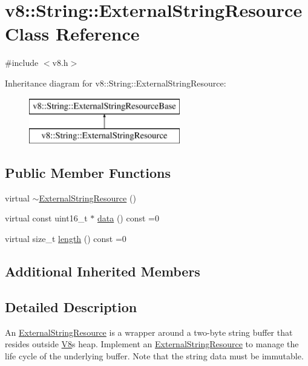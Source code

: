 \hypertarget{classv8_1_1_string_1_1_external_string_resource}{}\section{v8\+:\+:String\+:\+:External\+String\+Resource Class Reference}
\label{classv8_1_1_string_1_1_external_string_resource}


{\ttfamily \#include $<$v8.\+h$>$}

Inheritance diagram for v8\+:\+:String\+:\+:External\+String\+Resource\+:\begin{figure}[H]
\begin{center}
\leavevmode
\includegraphics[height=2.000000cm]{classv8_1_1_string_1_1_external_string_resource}
\end{center}
\end{figure}
\subsection*{Public Member Functions}
\begin{DoxyCompactItemize}
\item 
virtual \hyperlink{classv8_1_1_string_1_1_external_string_resource_a6b7ef9e33a47059092e1447b10c35416}{$\sim$\+External\+String\+Resource} ()
\item 
virtual const uint16\+\_\+t $\ast$ \hyperlink{classv8_1_1_string_1_1_external_string_resource_a53ca87d049fc8bfea5944adde4e7b159}{data} () const  =0
\item 
virtual size\+\_\+t \hyperlink{classv8_1_1_string_1_1_external_string_resource_af6c1b3f63e2e3112da788928aac96fab}{length} () const  =0
\end{DoxyCompactItemize}
\subsection*{Additional Inherited Members}


\subsection{Detailed Description}
An \hyperlink{classv8_1_1_string_1_1_external_string_resource}{External\+String\+Resource} is a wrapper around a two-\/byte string buffer that resides outside \hyperlink{classv8_1_1_v8}{V8}\textquotesingle{}s heap. Implement an \hyperlink{classv8_1_1_string_1_1_external_string_resource}{External\+String\+Resource} to manage the life cycle of the underlying buffer. Note that the string data must be immutable. 


